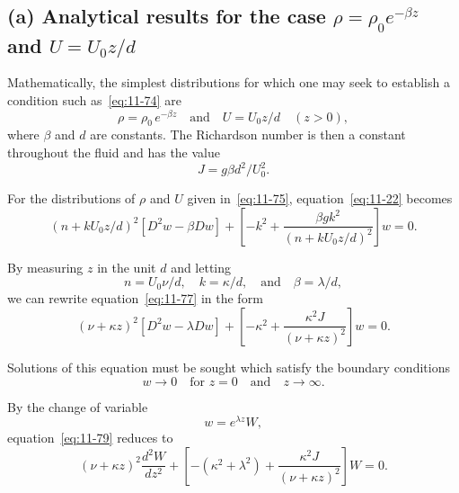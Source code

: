 \subsection*{(a) Analytical results for the case $\rho = \rho_0 e^{-\beta z}$ and $U = U_0 z/d$}

Mathematically, the simplest distributions for which one may seek to establish a condition such as~\eqref{eq:11-74} are
\begin{equation}
\label{eq:11-75}
\rho = \rho_0\,e^{-\beta z} \quad\text{and}\quad U = U_0 z/d \quad (z > 0),
\end{equation}
where $\beta$ and $d$ are constants. The Richardson number is then a constant throughout the fluid and has the value
\begin{equation}
\label{eq:11-76}
J = g\beta d^2/U_0^2.
\end{equation}

For the distributions of $\rho$ and $U$ given in~\eqref{eq:11-75}, equation~\eqref{eq:11-22} becomes
\begin{equation}
\label{eq:11-77}
(n+kU_0 z/d)^2\!\left[D^2w - \beta Dw\right]+\left[-k^2+\frac{\beta g k^2}{(n+kU_0 z/d)^2}\right]w = 0.
\end{equation}

By measuring $z$ in the unit $d$ and letting
\begin{equation}
\label{eq:11-78}
n = U_0\nu/d, \quad k = \kappa/d, \quad\text{and}\quad \beta = \lambda/d,
\end{equation}
we can rewrite equation~\eqref{eq:11-77} in the form
\begin{equation}
\label{eq:11-79}
(\nu+\kappa z)^2\!\left[D^2w - \lambda Dw\right]+\left[-\kappa^2+\frac{\kappa^2 J}{(\nu+\kappa z)^2}\right]w = 0.
\end{equation}

Solutions of this equation must be sought which satisfy the boundary conditions
\begin{equation}
\label{eq:11-80}
w \to 0 \quad\text{for } z = 0 \quad\text{and}\quad z \to \infty.
\end{equation}

By the change of variable
\begin{equation}
\label{eq:11-81}
w = e^{\lambda z}W,
\end{equation}
equation~\eqref{eq:11-79} reduces to
\begin{equation}
\label{eq:11-82}
(\nu+\kappa z)^2\frac{d^2W}{dz^2}+\left[-(\kappa^2+\lambda^2)+\frac{\kappa^2 J}{(\nu+\kappa z)^2}\right]W = 0.
\end{equation}

